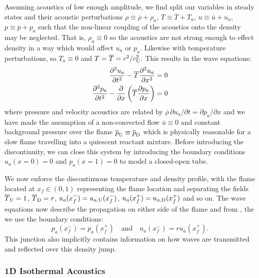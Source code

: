 Assuming acoustics of low enough amplitude, we find split our variables in steady states and their acoustic perturbations $ρ \equiv \overline{ρ} + ρ_a$, $T \equiv \overline{T} + T_a$, $u \equiv \overline{u} + u_a$, $p \equiv \overline{p} + p_a$ such that the non-linear coupling of the acoustics onto the density may be neglected. That is, $ρ_a \equiv 0$ so the acoustics are not strong enough to effect density in a way which would affect $u_a$ or $p_a$. Likewise with temperature perturbations, so $T_a \equiv 0$ and $T = \oT = c^2 / c_{\rm{U}}^2$. This results in the wave equations:
\begin{subequations} \label{eqn:wave_eqn}
\begin{align} 
\pdv[2]{u_a}{t} - \oT \pdv[2]{u_a}{x} &= 0 \label{eqn:wave_eqn_u} \\
\pdv[2]{p_a}{t} - \pdv{x} \left( \oT \pdv{p_a}{x} \right) &= 0 \label{eqn:wave_eqn_p}
\end{align}
\end{subequations}
where pressure and velocity acoustics are related by $\overline{ρ} \, \partial u_a / \partial t = \partial p_a / \partial x$ and we have made the assumption of a non-convected flow $\overline{u} \equiv 0$ and constant background pressure over the flame $\overline{p}_{\rm{U}} \equiv \overline{p}_{\rm{D}}$ which is physically reasonable for a slow flame travelling into a quiescent reactant mixture. Before introducing the discontinuity, we can close this system by introducing the boundary conditions $u_a(x = 0) = 0$ and $p_a(x = 1) = 0$ to model a closed-open tube.

We now enforce the discontinuous temperature and density profile, with the flame located at $x_f \in (0, 1)$ representing the flame location and separating the fields $\oT_{\rm{U}} = 1$, $\oT_{\rm{D}} = r$, $u_a(x_f^-) = u_{a, \rm{U}}(x_f^-)$, $u_a(x_f^+) = u_{a, \rm{D}}(x_f^+)$ and so on. The wave equations  now describe the propagation on either side of the flame and from \cite{gaton-perez2025MitigationThermoacousticInstabilities}, the we use the boundary conditions:
\begin{equation} \label{eqn:flame-BCs}
p_a(x_f^-) = p_a(x_f^+)
\quad \text{and} \quad
u_a(x_f^-) = r u_a(x_f^+).
\end{equation}
This junction also implicitly contains information on how waves are transmitted and reflected over this density jump.



\subsubsection{1D Isothermal Acoustics}


